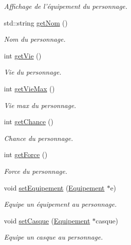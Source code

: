\begin{DoxyCompactItemize}
\begin{DoxyCompactList}\small\item\em Affichage de l'équipement du personnage. \end{DoxyCompactList}\item 
std\-::string \hyperlink{class_personnage_ac0fbc92a7e930ae26148e5e5247e1494}{get\-Nom} ()
\begin{DoxyCompactList}\small\item\em Nom du personnage. \end{DoxyCompactList}\item 
int \hyperlink{class_personnage_a261cbb9bb3b23a147d0f88b10eaa1857}{get\-Vie} ()
\begin{DoxyCompactList}\small\item\em Vie du personnage. \end{DoxyCompactList}\item 
int \hyperlink{class_personnage_a96cd651889938e58eafd48373f4c36c4}{get\-Vie\-Max} ()
\begin{DoxyCompactList}\small\item\em Vie max du personnage. \end{DoxyCompactList}\item 
int \hyperlink{class_personnage_aa5eabf95d3d0d31385bda9ae8427d57e}{get\-Chance} ()
\begin{DoxyCompactList}\small\item\em Chance du personnage. \end{DoxyCompactList}\item 
int \hyperlink{class_personnage_a40de0ba95f25eb6f1653b6a4183763ae}{get\-Force} ()
\begin{DoxyCompactList}\small\item\em Force du personnage. \end{DoxyCompactList}\item 
void \hyperlink{class_personnage_a311a98a60b751f7bb63897c29f57cd1c}{set\-Equipement} (\hyperlink{class_equipement}{Equipement} $\ast$e)
\begin{DoxyCompactList}\small\item\em Equipe un équipement au personnage. \end{DoxyCompactList}\item 
void \hyperlink{class_personnage_a6008154c7725bf6309cba8eb63cf2a94}{set\-Casque} (\hyperlink{class_equipement}{Equipement} $\ast$casque)
\begin{DoxyCompactList}\small\item\em Equipe un casque au personnage. \end{DoxyCompactList}\item 

\end{DoxyCompactItemize}
